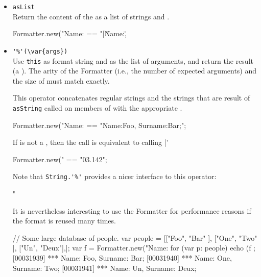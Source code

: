 \begin{itemize}
\item \lstinline|asList|\\
  Return the content of the  as a list of strings and
  .
\begin{urbiassert}
Formatter.new("Name:%
       == "[\"Name:\", %
\end{urbiassert}

\item \lstinline|'%'(\var{args})|\\
  Use \lstinline|this| as format string and  as the list of
  arguments, and return the result (a ).  The arity
  of the Formatter (i.e., the number of expected arguments) and the
  size of  must match exactly.

  This operator concatenates regular strings and the strings that are
  result of \lstinline|asString| called on members of  with
  the appropriate .
\begin{urbiassert}
Formatter.new("Name:%
       == "Name:Foo, Surname:Bar;";
\end{urbiassert}

  If  is not a , then the call is equivalent
  to calling |'%
\begin{urbiassert}
Formatter.new("%
       == "03.142";
\end{urbiassert}

  Note that \lstinline|String.'%'| provides a nicer interface to this
  operator:
\begin{urbiassert}
"%
\end{urbiassert}

  It is nevertheless interesting to use the Formatter for performance
  reasons if the format is reused many times.
\begin{urbiscript}
{
  // Some large database of people.
  var people =
    [["Foo", "Bar" ],
     ["One", "Two" ],
     ["Un",  "Deux"],];
  var f = Formatter.new("Name:%
  for (var p: people)
    echo (f %
};
[00031939] *** Name:    Foo, Surname:    Bar;
[00031940] *** Name:    One, Surname:    Two;
[00031941] *** Name:     Un, Surname:   Deux;
\end{urbiscript}


\end{itemize}

